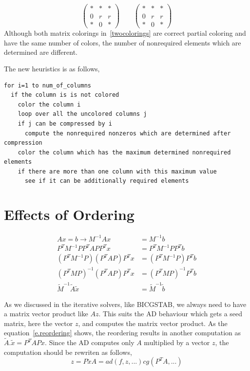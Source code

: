 \documentclass[12pt, oneside]{book}
\begin{document}
\begin{equation}
\left(\begin{array}{rrb}
* & * & *\\
0 & r & r \\
* & 0 & *
\end{array}\right)
\qquad
\left(\begin{array}{rbr}
* & * & *\\
0 & r & r \\
* & 0 & *
\end{array}\right)
\label{twocolorings}
\end{equation}
Although both matrix colorings in~\ref{twocolorings} 
are correct partial coloring and have the same number of
colors, the number of nonrequired elements 
which are determined are different.

The new heuristics is as follows,

\begin{lstlisting}
for i=1 to num_of_columns
  if the column is is not colored
    color the column i
    loop over all the uncolored columns j
    if j can be compressed by i
      compute the nonrequired nonzeros which are determined after compression
    color the column which has the maximum determined nonrequired elements
    if there are more than one column with this maximum value
      see if it can be additionally required elements

\end{lstlisting}
\section{Effects of Ordering}
\label{s.ordering.effect}


\begin{align} 
Ax = b \rightarrow M^{-1} Ax &= M^{-1}b\\
P^T M^{-1} P P^T A P P^T x &= P^T M^{-1} P P^T b\\
(P^T M^{-1} P) (P^T A P) P^T x &= (P^T M^{-1} P) P^T b\\
(P^T M P)^{-1} (P^T A P) P^T x &= (P^T M P)^{-1} P^T b\\
\tilde{M}^{-1}\tilde{A}\tilde{x} &= \tilde{M}^{-1}\tilde{b} 
\label{e.reordering}
\end{align}

As we discussed in the iterative solvers, like BICGSTAB,
we always need to have a matrix vector product like $Az$.
This suits the AD behaviour which gets a seed matrix, here the vector $z$, and
computes the matrix vector product. As the equation~\ref{e.reordering} shows,
the reordering results in another computation as $\tilde{A}.\tilde{x} = P^T A P x$.
Since the AD computes only $A$ multiplied by a vector $z$, 
the computation should be rewriten as follows,
$$
z = P \tilde{x}
A = ad(f,z,...)
cg(P^T A,...)
$$
\end{document}
